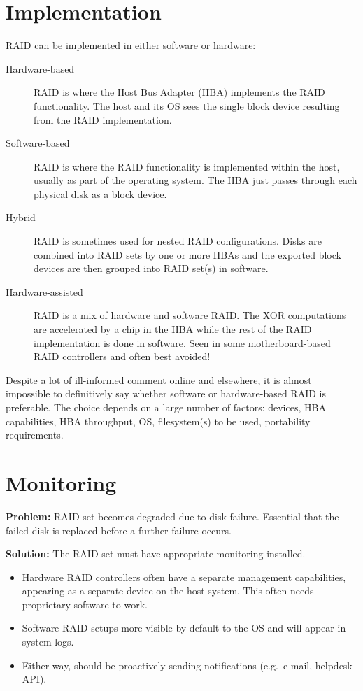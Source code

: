 \section{Implementation}
\label{sec:implementation}

RAID can be implemented in either software or hardware:

\begin{description}
\item[Hardware-based]
RAID is where the Host Bus Adapter (HBA) implements the RAID
functionality. The host and its OS sees the single block device
resulting from the RAID implementation.
\item[Software-based]
RAID is where the RAID functionality is implemented within the host,
usually as part of the operating system. The HBA just passes through
each physical disk as a block device.
\item[Hybrid]
RAID is sometimes used for nested RAID configurations. Disks are
combined into RAID sets by one or more HBAs and the exported block
devices are then grouped into RAID set(s) in software.
\item[Hardware-assisted]
RAID is a mix of hardware and software RAID. The XOR computations are
accelerated by a chip in the HBA while the rest of the RAID
implementation is done in software. Seen in some motherboard-based RAID
controllers and often best avoided!
\end{description}

Despite a lot of ill-informed comment online and elsewhere, it is almost
impossible to definitively say whether software or hardware-based RAID
is preferable. The choice depends on a large number of factors: devices,
HBA capabilities, HBA throughput, OS, filesystem(s) to be used,
portability requirements.

\section{Monitoring}
\label{sec:monitoring}

\textbf{Problem:} RAID set becomes degraded due to disk failure.
Essential that the failed disk is replaced before a further failure
occurs.

\textbf{Solution:} The RAID set must have appropriate monitoring
installed.

\begin{itemize}
\item
  Hardware RAID controllers often have a separate management
  capabilities, appearing as a separate device on the host system. This
  often needs proprietary software to work.
\item
  Software RAID setups more visible by default to the OS and will appear
  in system logs.
\item
  Either way, should be proactively sending notifications (e.g.~e-mail,
  helpdesk API).
\end{itemize}


